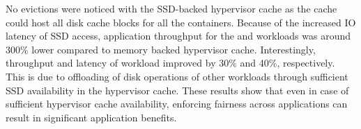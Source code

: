 No evictions were noticed with the SSD-backed hypervisor cache %
as the cache could host all disk cache blocks for all the
containers.
%
Because of the increased IO latency of SSD access, application
throughput for the \web{} and \video{} workloads 
was around 300\% lower compared to memory backed hypervisor cache.
%
Interestingly, throughput and latency of \mail{} workload improved
by 30\% and 40\%, respectively.
%
This is due to offloading of disk operations of other workloads 
through sufficient SSD availability in the hypervisor cache.
%
These results show that even in case of sufficient hypervisor cache
availability, enforcing fairness across applications can result in
significant application benefits.


